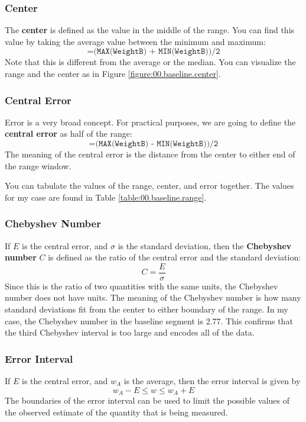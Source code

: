 \subsubsection{Center}
%
The \textbf{center} is defined as the value in the middle of the range. You can find this value by taking the average value between the minimum and maximum:
\begin{equation}
    \texttt{=(MAX(WeightB) + MIN(WeightB))/2}
\end{equation}
Note that this is different from the average or the median. You can visualize the range and the center as in Figure \ref{figure:00.baseline.center}.
%
\subsubsection{Central Error}
%
Error is a very broad concept. For practical purposes, we are going to define the \textbf{central error} as half of the range:
\begin{equation}
    \texttt{=(MAX(WeightB) - MIN(WeightB))/2}
    \label{eq:00.error}
\end{equation}
The meaning of the central error is the distance from the center to either end of the range window.

You can tabulate the values of the range, center, and error together. The values for my case are found in Table \ref{table:00.baseline.range}.
%
\subsubsection{Chebyshev Number}
%
If $E$ is the central error, and $\sigma$ is the standard deviation, then the \textbf{Chebyshev number} $C$ is defined as the ratio of the central error and the standard deviation:
\begin{equation}
    C = \frac{E}{\sigma}
\end{equation}
Since this is the ratio of two quantities with the same units, the Chebyshev number does not have units. The meaning of the Chebyshev number is how many standard deviations fit from the center to either boundary of the range. In my case, the Chebyshev number in the baseline segment is 2.77. This confirms that the third Chebyshev interval is too large and encodes all of the data.
%
\subsubsection{Error Interval}
%
If $E$ is the central error, and $w_{A}$ is the average, then the error interval is given by
\begin{equation}
    w_{A} - E \leq w \leq w_{A} + E
\end{equation}
The boundaries of the error interval can be used to limit the possible values of the observed estimate of the quantity that is being measured.

